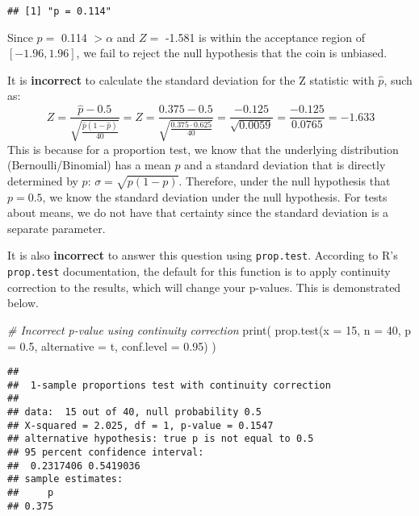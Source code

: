 \documentclass[
]{article}
\newenvironment{Shaded}{\begin{snugshade}}{\end{snugshade}}
\newcommand{\AttributeTok}[1]{\textcolor[rgb]{0.77,0.63,0.00}{#1}}
\newcommand{\CommentTok}[1]{\textcolor[rgb]{0.56,0.35,0.01}{\textit{#1}}}
\newcommand{\DecValTok}[1]{\textcolor[rgb]{0.00,0.00,0.81}{#1}}
\newcommand{\FloatTok}[1]{\textcolor[rgb]{0.00,0.00,0.81}{#1}}
\newcommand{\FunctionTok}[1]{\textcolor[rgb]{0.00,0.00,0.00}{#1}}
\newcommand{\NormalTok}[1]{#1}
\newcommand{\StringTok}[1]{\textcolor[rgb]{0.31,0.60,0.02}{#1}}
\begin{document}
\begin{verbatim}
## [1] "p = 0.114"
\end{verbatim}

Since \(p=\) 0.114 \(> \alpha\) and \(Z=\) -1.581 is within the
acceptance region of \([-1.96, 1.96]\), we fail to reject the null
hypothesis that the coin is unbiased.

It is \textbf{incorrect} to calculate the standard deviation for the Z
statistic with \(\hat{p}\), such as:\\
\[Z = \frac{\hat{p} - 0.5}{\sqrt{\frac{\hat{p} (1-\hat{p})}{40}}} = Z = \frac{0.375 - 0.5}{\sqrt{\frac{0.375 \cdot 0.625}{40}}} = \frac{-0.125}{\sqrt{0.0059}}=\frac{-0.125}{0.0765}=-1.633\]
This is because for a proportion test, we know that the underlying
distribution (Bernoulli/Binomial) has a mean \(p\) and a standard
deviation that is directly determined by \(p\):
\(\sigma = \sqrt{p(1-p)}\). Therefore, under the null hypothesis that
\(p=0.5\), we know the standard deviation under the null hypothesis. For
tests about means, we do not have that certainty since the standard
deviation is a separate parameter.

It is also \textbf{incorrect} to answer this question using
\texttt{prop.test}. According to R's \texttt{prop.test} documentation,
the default for this function is to apply continuity correction to the
results, which will change your p-values. This is demonstrated below.

\begin{Shaded}
\begin{Highlighting}[]
\CommentTok{\# Incorrect p{-}value using continuity correction}
\FunctionTok{print}\NormalTok{(}
  \FunctionTok{prop.test}\NormalTok{(}\AttributeTok{x =} \DecValTok{15}\NormalTok{, }\AttributeTok{n =} \DecValTok{40}\NormalTok{, }\AttributeTok{p =} \FloatTok{0.5}\NormalTok{, }\AttributeTok{alternative =} \StringTok{\textquotesingle{}t\textquotesingle{}}\NormalTok{, }\AttributeTok{conf.level =} \FloatTok{0.95}\NormalTok{)}
\NormalTok{)}
\end{Highlighting}
\end{Shaded}

\begin{verbatim}
## 
##  1-sample proportions test with continuity correction
## 
## data:  15 out of 40, null probability 0.5
## X-squared = 2.025, df = 1, p-value = 0.1547
## alternative hypothesis: true p is not equal to 0.5
## 95 percent confidence interval:
##  0.2317406 0.5419036
## sample estimates:
##     p 
## 0.375
\end{verbatim}
\end{document}
